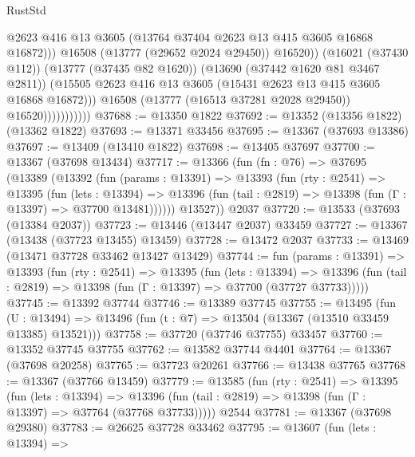 \begin{lexlean}{RustStd}
\begin{coremodule}
                                    @2623
                                    @416
                                    @13
                                    @3605
                                    (@13764 @37404 @2623 @13 @415 @3605 @16868 @16872)))
                                @16508
                                (@13777 (@29652 @2024 @29450))
                                @16520))
                            (@16021 (@37430 @112))
                            (@13777 (@37435 @82 @1620))
                            (@13690 (@37442 @1620 @81 @3467 @2811))
                            (@15505
                              @2623
                              @416
                              @13
                              @3605
                              (@15431 @2623 @13 @415 @3605 @16868 @16872)))
                          @16508
                          (@13777 (@16513 @37281 @2028 @29450))
                          @16520)))))))))))
@37688 := @13350 @1822
@37692 := @13352 (@13356 @1822) (@13362 @1822)
@37693 := @13371 @33456
@37695 := @13367 (@37693 @13386)
@37697 := @13409 (@13410 @1822)
@37698 := @13405 @37697
@37700 := @13367 (@37698 @13434)
@37717 := @13366
    (fun (fn : @76) =>
    @37695
      (@13389
        (@13392
          (fun (params : @13391) =>
          @13393
            (fun (rty : @2541) =>
            @13395
              (fun (lets : @13394) =>
              @13396 (fun (tail : @2819) => @13398 (fun (Γ : @13397) => @37700 @13481))))))
        @13527))
    @2037
@37720 := @13533 (@37693 (@13384 @2037))
@37723 := @13446 (@13447 @2037) @33459
@37727 := @13367 (@13438 (@37723 @13455) @13459)
@37728 := @13472 @2037
@37733 := @13469 (@13471 @37728 @33462 @13427 @13429)
@37744 := fun (params : @13391) =>
  @13393
    (fun (rty : @2541) =>
    @13395
      (fun (lets : @13394) =>
      @13396 (fun (tail : @2819) => @13398 (fun (Γ : @13397) => @37700 (@37727 @37733)))))
@37745 := @13392 @37744
@37746 := @13389 @37745
@37755 := @13495
    (fun (U : @13494) => @13496 (fun (t : @7) => @13504 (@13367 (@13510 @33459 @13385) @13521)))
@37758 := @37720 (@37746 @37755) @33457
@37760 := @13352 @37745 @37755
@37762 := @13582 @37744 @4401
@37764 := @13367 (@37698 @20258)
@37765 := @37723 @20261
@37766 := @13438 @37765
@37768 := @13367 (@37766 @13459)
@37779 := @13585
    (fun (rty : @2541) =>
    @13395
      (fun (lets : @13394) =>
      @13396 (fun (tail : @2819) => @13398 (fun (Γ : @13397) => @37764 (@37768 @37733)))))
    @2544
@37781 := @13367 (@37698 @29380)
@37783 := @26625 @37728 @33462
@37795 := @13607
    (fun (lets : @13394) =>

\end{coremodule}
\end{lexlean}
